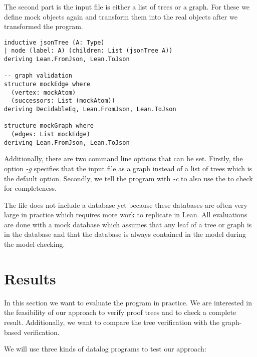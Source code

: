 The second part is the input file is either a list of trees or a graph. For these we define mock objects again and transform them into the real objects after we transformed the program.

\begin{lstlisting}
inductive jsonTree (A: Type)
| node (label: A) (children: List (jsonTree A))
deriving Lean.FromJson, Lean.ToJson

-- graph validation
structure mockEdge where
  (vertex: mockAtom)
  (successors: List (mockAtom))
deriving DecidableEq, Lean.FromJson, Lean.ToJson

structure mockGraph where
  (edges: List mockEdge)
deriving Lean.FromJson, Lean.ToJson
\end{lstlisting}

Additionally, there are two command line options that can be set. Firstly, the option \textit{-g} specifies that the input file as a graph instead of a list of trees which is the default option. Secondly, we tell the program with \textit{-c} to also use the \modelChecker to check for completeness.

The file does not include a database yet because these databases are often very large in practice which requires more work to replicate in Lean. All evaluations are done with a mock database which assumes that any leaf of a tree or graph is in the database and that the database is always contained in the model during the model checking. 


\section{Results}

In this section we want to evaluate the program in practice. We are interested in the feasibility of our approach to verify proof trees and to check a complete result. Additionally, we want to compare the tree verification with the graph-based verification.

We will use three kinds of datalog programs to test our approach:

